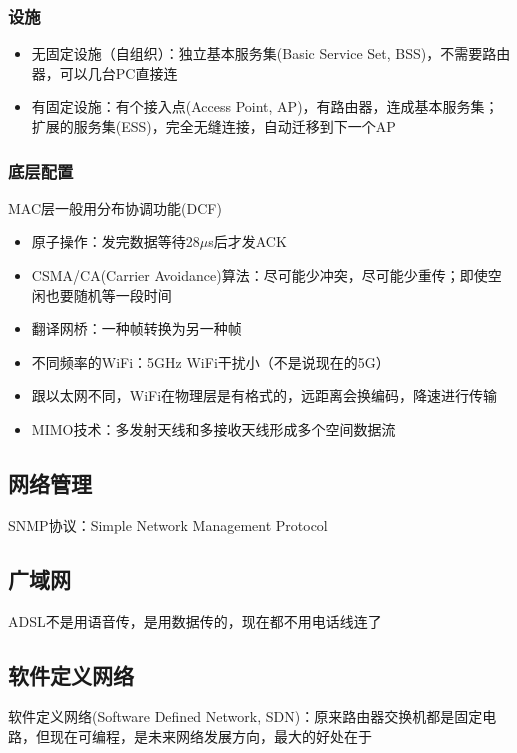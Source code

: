 \subsubsection{设施}
\begin{itemize}
\item 无固定设施（自组织）：独立基本服务集(Basic Service Set, BSS)，不需要路由器，可以几台PC直接连
\item 有固定设施：有个接入点(Access Point, AP)，有路由器，连成基本服务集；
扩展的服务集(ESS)，完全无缝连接，自动迁移到下一个AP
\end{itemize}

\subsubsection{底层配置}
MAC层一般用分布协调功能(DCF)
\begin{itemize}
\item 原子操作：发完数据等待28$\mu$s后才发ACK
\item CSMA/CA(Carrier Avoidance)算法：尽可能少冲突，尽可能少重传；即使空闲也要随机等一段时间
\end{itemize}

\myhline
\begin{itemize}
\item 翻译网桥：一种帧转换为另一种帧
\item 不同频率的WiFi：5GHz WiFi干扰小（不是说现在的5G）
\item 跟以太网不同，WiFi在物理层是有格式的，远距离会换编码，降速进行传输
\item MIMO技术：多发射天线和多接收天线形成多个空间数据流
\end{itemize}

\subsection{网络管理}
SNMP协议：Simple Network Management Protocol

\subsection{广域网}
ADSL不是用语音传，是用数据传的，现在都不用电话线连了

\subsection{软件定义网络}
软件定义网络(Software Defined Network, SDN)：原来路由器交换机都是固定电路，但现在可编程，是未来网络发展方向，最大的好处在于

